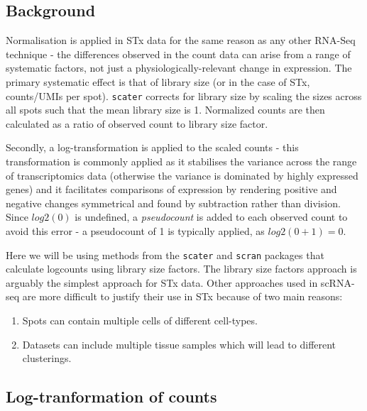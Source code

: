 \documentclass[
]{book}
\providecommand{\tightlist}{%
  \setlength{\itemsep}{0pt}\setlength{\parskip}{0pt}}
\begin{document}
\hypertarget{background}{%
\subsection{Background}\label{background}}

Normalisation is applied in STx data for the same reason as any other RNA-Seq technique - the differences observed in the count data can arise from a range of systematic factors, not just a physiologically-relevant change in expression. The primary systematic effect is that of library size (or in the case of STx, counts/UMIs per spot). \texttt{scater} corrects for library size by scaling the sizes across all spots such that the mean library size is 1. Normalized counts are then calculated as a ratio of observed count to library size factor.

Secondly, a log-transformation is applied to the scaled counts - this transformation is commonly applied as it stabilises the variance across the range of transcriptomics data (otherwise the variance is dominated by highly expressed genes) and it facilitates comparisons of expression by rendering positive and negative changes symmetrical and found by subtraction rather than division. Since \(log2(0)\) is undefined, a \emph{pseudocount} is added to each observed count to avoid this error - a pseudocount of 1 is typically applied, as \(log2(0+1) = 0\).

Here we will be using methods from the \texttt{scater} \citep{McCarthy2017Apr} and \texttt{scran} \citep{Lun2016Oct} packages that calculate logcounts using library size factors. The library size factors approach is arguably the simplest approach for STx data. Other approaches used in scRNA-seq are more difficult to justify their use in STx because of two main reasons:

\begin{enumerate}
\def\labelenumi{\arabic{enumi}.}
\tightlist
\item
  Spots can contain multiple cells of different cell-types.
\item
  Datasets can include multiple tissue samples which will lead to different clusterings.
\end{enumerate}

\hypertarget{log-tranformation-of-counts}{%
\subsection{Log-tranformation of counts}\label{log-tranformation-of-counts}}
\end{document}
